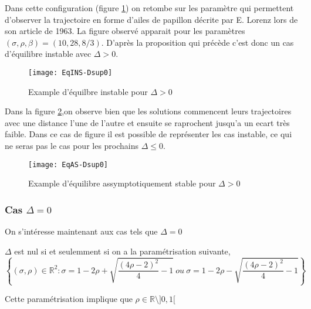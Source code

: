 \documentclass{article}
\newcommand{\R}{\mathbb{R}}
\newtheorem[M , nocut]{prop}{Proposition}[section]
\newtheorem[M]{propt}{Propriété}[section]
\newtheorem[L , nocut]{thm}{Théoreme}
\newtheorem[L]{cor}{Corollaire}
\begin{document}
\begin{example} 
    Dans cette configuration (figure \ref{fig:EqINS-Dsup0}) on retombe sur les paramètre qui permettent d'observer la trajectoire en forme d'ailes de papillon décrite par E. Lorenz lors de son article de 1963\cite{lorenz1963}. La figure observé apparait pour les paramètres $(\sigma,\rho,\beta) = (10,28,8/3)$. D'après la proposition qui précède c'est donc un cas d'équilibre instable avec $\Delta>0$.

    \begin{figure}[!ht]
        \centering
        \texttt{[image: EqINS-Dsup0]}
        \caption{Example d'équilbre instable pour $\Delta>0$}
        \label{fig:EqINS-Dsup0}
    \end{figure}

    Dans la figure \ref{fig:EqAS-Dsup0},on observe bien que les solutions commencent leurs trajectoires avec une distance l'une de l'autre et ensuite se raprochent jusqu'a un ecart très faible. Dans ce cas de figure il est possible de représenter les cas instable, ce qui ne seras pas le cas pour les prochains $\Delta \le 0$.
    
    \begin{figure}[!ht]
        \centering
        \texttt{[image: EqAS-Dsup0]}
        \caption{Example d'équilibre assymptotiquement stable pour $\Delta>0$}
        \label{fig:EqAS-Dsup0}
    \end{figure}
    
\end{example}

\subsubsection*{Cas $\Delta = 0$}
On s'intéresse maintenant aux cas tels que $\Delta=0$

\begin{prop} 
    \label{prop:Deg0}
    $\Delta$ est nul si et seulemment si on a la paramétrisation suivante,
    \[
        \left\{(\sigma,\rho)\in \R ^2 :\sigma = 1-2 \rho + \sqrt{ \frac{(4\rho-2)^2}{4} -1 }\ ou\ \sigma = 1-2 \rho - \sqrt{ \frac{(4\rho-2)^2}{4} -1 } \right\}  
    \]
\end{prop}

\begin{example}[Remarque]
    Cette paramétrisation implique que $\rho \in \R \setminus ]0,1[$ 
\end{example}
\end{document}
